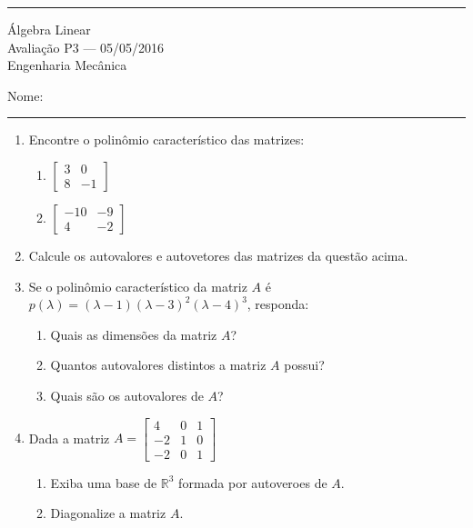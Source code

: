 \documentclass{article}
\begin{document}
\noindent{}\rule{\textwidth}{0.4pt}
\begin{center}
	\'{A}lgebra Linear\\
	Avalia\c{c}\~ao P3 --- 05/05/2016 \\
	Engenharia Mec\^anica \\
	\vspace{0.2cm}
\end{center}
Nome: \\
\noindent{}\rule{\textwidth}{0.4pt}

\begin{enumerate}
\item Encontre o polin\^omio caracter\'istico das matrizes:
	\begin{enumerate}
		\item $\left[\begin{array}{cc}
					3 & 0 \\
					8 & -1
			\end{array}\right]$
		\item $\left[\begin{array}{cc}
					-10 & -9 \\
					4 & -2
			\end{array}\right]$
	\end{enumerate}

\item Calcule os autovalores e autovetores das matrizes da quest\~ao acima.

\item Se o polin\^omio caracter\'istico da matriz $A$ \'e $p(\lambda) = (\lambda-1)(\lambda-3)^2(\lambda-4)^3$, responda:
	\begin{enumerate}
		\item Quais as dimens\~oes da matriz $A$?
		\item Quantos autovalores distintos a matriz $A$ possui?
		\item Quais s\~ao os autovalores de $A$?
	\end{enumerate}

\item Dada a matriz
	$A=\left[\begin{array}{ccc}
			4 & 0 & 1 \\
			-2 & 1 & 0 \\
			-2 & 0 & 1
		\end{array}\right]$
	\begin{enumerate}
		\item Exiba uma base de $\mathbb{R}^3$ formada por autoveroes de $A$.
		\item Diagonalize a matriz $A$.
	\end{enumerate}


\end{enumerate}
\end{document}
